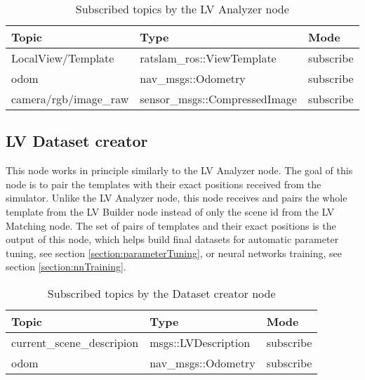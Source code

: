 \begin{table}[htpb]
    \caption{Subscribed  topics by the LV Analyzer node}\label{tab:lvAnalTopics}
    \centering
    \begin{tabular}{l l l}
        \toprule
        Topic                 & Type                          & Mode      \\
        \midrule
        LocalView/Template    & ratslam\_ros::ViewTemplate    & subscribe \\
        odom                  & nav\_msgs::Odometry           & subscribe \\
        camera/rgb/image\_raw & sensor\_msgs::CompressedImage & subscribe \\
        \bottomrule
    \end{tabular}
\end{table}

\subsection{LV Dataset creator}\label{section:lvdatasetCreator}

This node works in principle similarly to the LV Analyzer node. The goal of this node is to pair the templates with their exact positions received from the simulator. Unlike the LV Analyzer node, this node receives and pairs the whole template from the LV Builder node instead of only the scene id from the LV Matching node. The set of pairs of templates and their exact positions is the output of this node, which helps build final datasets for automatic parameter tuning, see section \ref{section:parameterTuning}, or neural networks training, see section \ref{section:nnTraining}.


\begin{table}[htpb]
    \caption{Subscribed  topics by the Dataset creator node}\label{tab:datasetCreatorTopics}
    \centering
    \begin{tabular}{l l l}
        \toprule
        Topic                      & Type                & Mode      \\
        \midrule
        current\_scene\_descripion & msgs::LVDescription & subscribe \\
        odom                       & nav\_msgs::Odometry & subscribe \\
        \bottomrule
    \end{tabular}
\end{table}
